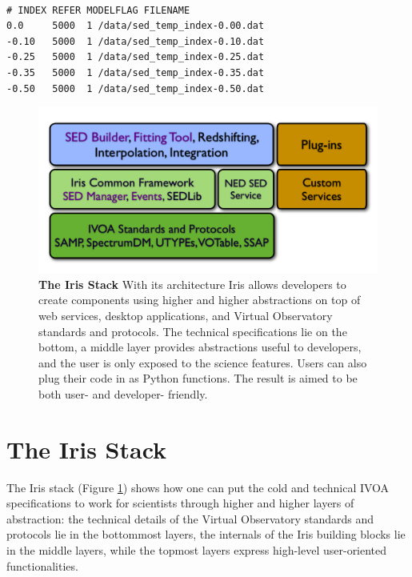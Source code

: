 \documentclass[final,5p,authoryear]{elsarticle}
\begin{document}
\begin{lstlisting}[style=code,
	caption=Example of template library definition file,
	label=lst:templateconfig]

# INDEX REFER MODELFLAG FILENAME
0.0     5000  1	/data/sed_temp_index-0.00.dat
-0.10   5000  1 /data/sed_temp_index-0.10.dat
-0.25   5000  1 /data/sed_temp_index-0.25.dat
-0.35   5000  1 /data/sed_temp_index-0.35.dat
-0.50   5000  1 /data/sed_temp_index-0.50.dat
\end{lstlisting}

\begin{figure}
\begin{center}
\includegraphics[width=\columnwidth]{figures/IrisStack.png} \caption{\textbf{The
Iris Stack} With its architecture Iris allows developers to create components
using higher and higher abstractions on top of web services, desktop
applications, and Virtual Observatory standards and protocols. The technical
specifications lie on the bottom, a middle layer provides abstractions useful to
developers, and the user is only exposed to the science features. Users can also
plug their code in as Python functions. The result is aimed to be both user- and
developer- friendly.}
\label{fig:stack}
\end{center}
\end{figure}

\section{The Iris Stack} \label{sec:stack}

The Iris stack (Figure \ref{fig:stack}) shows how one can put the cold and
technical IVOA specifications to work for scientists through higher and higher
layers of abstraction: the technical details of the Virtual Observatory
standards and protocols lie in the bottommost layers, the internals of the Iris
building blocks lie in the middle layers, while the topmost layers express
high-level user-oriented functionalities.
\end{document}
